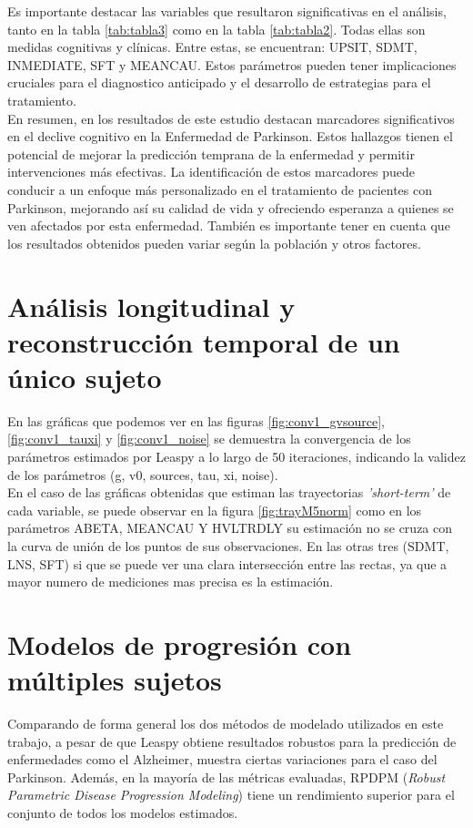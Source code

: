 Es importante destacar las variables que resultaron significativas en el análisis, tanto en la tabla \ref{tab:tabla3} como en la tabla \ref{tab:tabla2}. Todas ellas son medidas cognitivas y clínicas. Entre estas, se encuentran: UPSIT, SDMT, INMEDIATE, SFT y MEANCAU. Estos parámetros pueden tener implicaciones cruciales para el diagnostico anticipado y el desarrollo de estrategias para el tratamiento.\\

En resumen, en los resultados de este estudio destacan marcadores significativos en el declive cognitivo en la Enfermedad de Parkinson. Estos hallazgos tienen el potencial de mejorar la predicción temprana de la enfermedad y permitir intervenciones más efectivas. La identificación de estos marcadores puede conducir a un enfoque más personalizado en el tratamiento de pacientes con Parkinson, mejorando así su calidad de vida y ofreciendo esperanza a quienes se ven afectados por esta enfermedad. También es importante tener en cuenta que los resultados obtenidos pueden variar según la población y otros factores.


\section{Análisis longitudinal y reconstrucción temporal de un único sujeto}

En las gráficas que podemos ver en las figuras \ref{fig:conv1_gvsource}, \ref{fig:conv1_tauxi} y \ref{fig:conv1_noise} se demuestra la convergencia de los parámetros estimados por Leaspy a lo largo de 50 iteraciones, indicando la validez de los parámetros (g, v0, sources, tau, xi, noise).\\

En el caso de las gráficas obtenidas que estiman las trayectorias \textit{'short-term'} de cada variable, se puede observar en la figura \ref{fig:trayM5norm} como en los parámetros ABETA, MEANCAU Y HVLTRDLY su estimación no se cruza con la curva de unión de los puntos de sus observaciones. En las otras tres (SDMT, LNS, SFT) si que se puede ver una clara intersección entre las rectas, ya que a mayor numero de mediciones mas precisa es la estimación.


\section{Modelos de progresión con múltiples sujetos}
Comparando de forma general los dos métodos de modelado utilizados en este trabajo, a pesar de que Leaspy obtiene resultados robustos para la predicción de enfermedades como el Alzheimer, muestra ciertas variaciones para el caso del Parkinson. Además, en la mayoría de las métricas evaluadas, RPDPM (\textit{Robust Parametric Disease Progression Modeling}) tiene un rendimiento superior para el conjunto de todos los modelos estimados.\\

